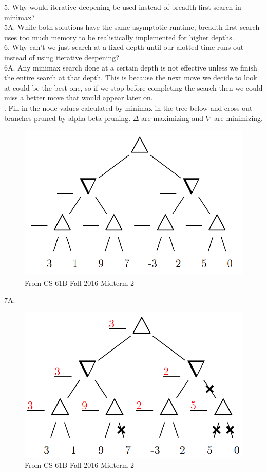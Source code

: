 \documentclass[12pt, letterpaper]{article}
\begin{document}
5. Why would iterative deepening be used instead of breadth-first search in minimax? \\
5A. While both solutions have the same asymptotic runtime, breadth-first search uses too much memory to be realistically implemented for higher depths. \\

6. Why can't we just search at a fixed depth until our alotted time runs out instead of using iterative deepening? \\
6A. Any minimax search done at a certain depth is not effective unless we finish the entire search at that depth. This is because the next move we decide to look at could be the best one, so if we stop before completing the search then we could miss a better move that would appear later on. \\
. Fill in the node values calculated by minimax in the tree below and cross out branches pruned by alpha-beta pruning. $\Delta$ are maximizing and $\nabla$ are minimizing.
\begin{figure}[H]
    \centering
    \includegraphics[scale=0.3]{minimax-prob.png}
    \caption*{From CS 61B Fall 2016 Midterm 2}
\end{figure}
7A.
\begin{figure}[H]
    \centering
    \includegraphics[scale=0.3]{minimax-sol.png}
    \caption*{From CS 61B Fall 2016 Midterm 2}
\end{figure}
\end{document}
